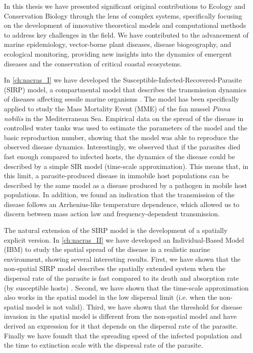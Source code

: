 
In this thesis we have presented significant original contributions to Ecology
and Conservation Biology through the lens of complex systems, specifically
focusing on the development of innovative theoretical models and computational
methods to address key challenges in the field. We have contributed to the
advancement of marine epidemiology, vector-borne plant diseases, disease
biogeography, and ecological monitoring, providing new insights into the
dynamics of emergent diseases and the conservation of critical coastal
ecosystems.


In \cref{ch:nacras_I} we have developed the
Susceptible-Infected-Recovered-Parasite (SIRP) model, a compartmental model
that describes the transmission dynamics of diseases affecting sessile marine
organisms \cite{GimenezRomero2021}. The model has been specifically applied to
study the Mass Mortality Event (MME) of the fan mussel \textit{Pinna nobilis}
in the Mediterranean Sea. Empirical data on the spread of the disease in
controlled water tanks was used to estimate the parameters of the model and the
basic reproduction number, showing that the model was able to reproduce the
observed disease dynamics. Interestingly, we observed that if the parasites
died fast enough compared to infected hosts, the dynamics of the disease could
be described by a simple SIR model (time-scale approximation). This means that,
in this limit, a parasite-produced disease in immobile host populations can be
described by the same model as a disease produced by a pathogen in mobile host
populations. In addition, we found an indication that the transmission of the
disease follows an Arrhenius-like temperature dependence, which allowed us to
discern between mass action law and frequency-dependent transmission.

The natural extension of the SIRP model is the development of a spatially
explicit version. In \cref{ch:nacras_II} we have developed an Individual-Based
Model (IBM) to study the spatial spread of the disease in a realistic marine
environment, showing several interesting results. First, we have shown that the
non-spatial SIRP model describes the spatially extended system when the
dispersal rate of the parasite is fast compared to its death and absorption
rate (by susceptible hosts) \cite{GimenezRomero_2022_RSos}. Second, we have
shown that the time-scale approximation also works in the spatial model in the
low dispersal limit (i.e. when the non-spatial model is not valid). Third, we
have shown that the threshold for disease invasion in the spatial model is
different from the non-spatial model and have derived an expression for it that
depends on the dispersal rate of the parasite. Finally we have foundt that the
spreading speed of the infected population and the time to extinction scale
with the dispersal rate of the parasite.

